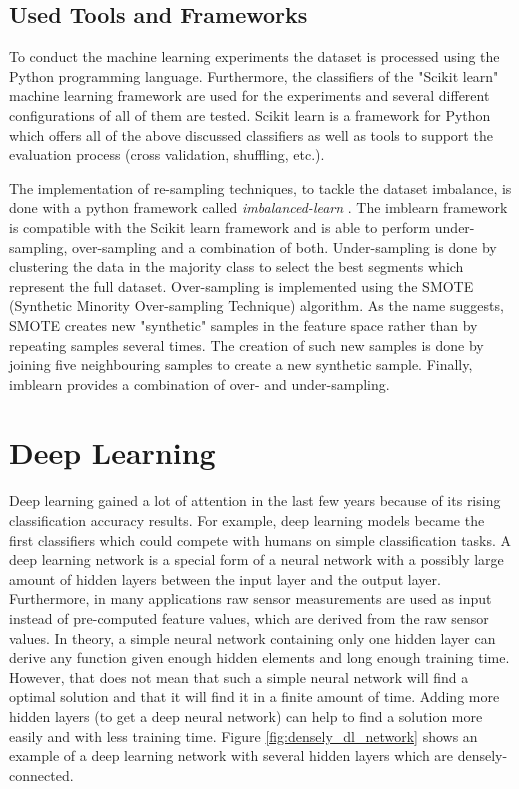 \subsection{Used Tools and Frameworks}

To conduct the machine learning experiments the dataset is processed using the Python programming language. Furthermore, the classifiers of the "Scikit learn" machine learning framework are used for the experiments and several different configurations of all of them are tested. Scikit learn is a framework for Python which offers all of the above discussed classifiers as well as tools to support the evaluation process (cross validation, shuffling, etc.).

The implementation of re-sampling techniques, to tackle the dataset imbalance, is done with a python framework called \emph{imbalanced-learn} \cite{imblearn_reference}. The imblearn framework is compatible with the Scikit learn framework and is able to perform under-sampling, over-sampling and a combination of both. Under-sampling is done by clustering the data in the majority class to select the best segments which represent the full dataset. Over-sampling is implemented using the SMOTE (Synthetic Minority Over-sampling Technique) algorithm. As the name suggests, SMOTE creates new "synthetic" samples in the feature space rather than by repeating samples several times. The creation of such new samples is done by joining five neighbouring samples to create a new synthetic sample. Finally, imblearn provides a combination of over- and under-sampling.







\section{Deep Learning}
\label{sec:deep_learning}

Deep learning gained a lot of attention in the last few years because of its rising classification accuracy results. For example, deep learning models became the first classifiers which could compete with humans on simple classification tasks. A deep learning network is a special form of a neural network with a possibly large amount of hidden layers between the input layer and the output layer. Furthermore, in many applications raw sensor measurements are used as input instead of pre-computed feature values, which are derived from the raw sensor values. In theory, a simple neural network containing only one hidden layer can derive any function given enough hidden elements and long enough training time. However, that does not mean that such a simple neural network will find a optimal solution and that it will find it in a finite amount of time. Adding more hidden layers (to get a deep neural network) can help to find a solution more easily and with less training time. 
Figure \ref{fig:densely_dl_network} shows an example of a deep learning network with several hidden layers which are densely-connected.

